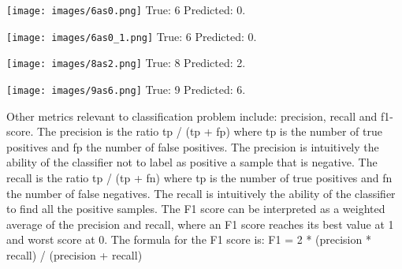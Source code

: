 \documentclass[a4paper]{scrartcl}
\begin{document}
\begin{minipage}[t]{0.2\textwidth}
\begin{center}
\texttt{[image: images/6as0.png]}
\newline True: 6 \newline Predicted: 0.
\end{center}
\end{minipage}
\begin{minipage}[t]{0.2\textwidth}
\begin{center}
\texttt{[image: images/6as0\_1.png]}
\newline True: 6 \newline Predicted: 0.
\end{center}
\end{minipage}
\begin{minipage}[t]{0.2\textwidth}
\begin{center}
\texttt{[image: images/8as2.png]}
\newline True: 8 \newline Predicted: 2.
\end{center}
\end{minipage}
\begin{minipage}[t]{0.2\textwidth}
\begin{center}
\texttt{[image: images/9as6.png]}
\newline True: 9 \newline Predicted: 6.
\end{center}
\end{minipage}
\vspace{2em}
\par Other metrics relevant to classification problem include: precision, recall and f1-score. The precision is the ratio tp / (tp + fp) where tp is the number of true positives and fp the number of false positives. The precision is intuitively the ability of the classifier not to label as positive a sample that is negative. The recall is the ratio tp / (tp + fn) where tp is the number of true positives and fn the number of false negatives. The recall is intuitively the ability of the classifier to find all the positive samples. The F1 score can be interpreted as a weighted average of the precision and recall, where an F1 score reaches its best value at 1 and worst score at 0. The formula for the F1 score is: \newline 
F1 = 2 * (precision * recall) / (precision + recall)
\end{document}

